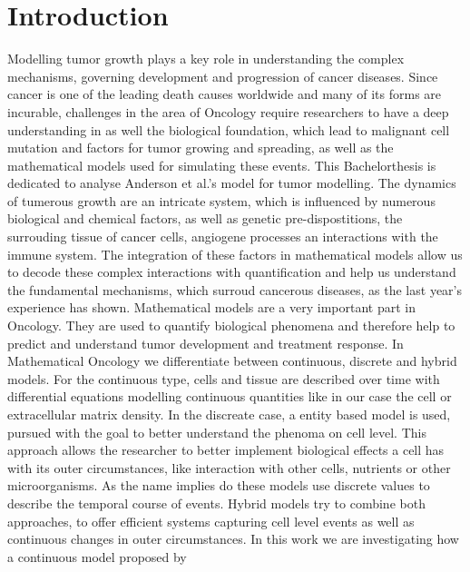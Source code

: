 \section{Introduction}
Modelling tumor growth plays a key role in understanding the complex mechanisms, 
governing development and progression of cancer diseases. Since cancer is one of the 
leading death causes worldwide and many of its forms are incurable, challenges in the area of 
Oncology require researchers to have a deep understanding in as well the biological foundation, 
which lead to malignant cell mutation and factors for tumor growing and spreading, as well as the 
mathematical models used for simulating these events. This Bachelorthesis is dedicated to 
analyse Anderson et al.'s \cite*{anderson_continuous_1998,anderson_mathematical_2000} model for 
tumor modelling.\newline
The dynamics of tumerous growth are an intricate system, which is influenced by numerous biological and 
chemical factors, as well as genetic pre-dispostitions, the surrouding tissue of cancer cells, angiogene 
processes an interactions with the immune system. The integration of these factors in mathematical models
allow us to decode these complex interactions with quantification and help us understand the fundamental 
mechanisms, which surroud cancerous diseases, as the last year's experience has shown. \newline 
Mathematical models are a very important part in Oncology. They are used to quantify biological phenomena and 
therefore help to predict and understand tumor development and treatment response. In Mathematical Oncology 
we differentiate between continuous, discrete and hybrid models. For the continuous type, cells and tissue are 
described over time with differential equations modelling continuous quantities like in our case the cell or extracellular matrix density. 
In the discreate case, a entity based model is used, pursued with the goal to better understand the phenoma on cell level.
This approach allows the researcher to better implement biological effects a cell has with its outer circumstances, like interaction 
with other cells, nutrients or other microorganisms. As the name implies do these models use discrete values to describe the temporal 
course of events. Hybrid models try to combine both approaches, to offer efficient systems capturing cell level events 
as well as continuous changes in outer circumstances.
\newline In this work we are investigating how a continuous model proposed by 

